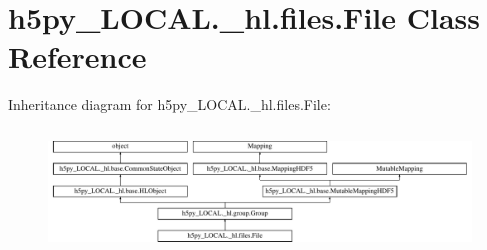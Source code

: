 \hypertarget{classh5py__LOCAL_1_1__hl_1_1files_1_1File}{}\section{h5py\+\_\+\+L\+O\+C\+A\+L.\+\_\+hl.\+files.\+File Class Reference}
\label{classh5py__LOCAL_1_1__hl_1_1files_1_1File}
Inheritance diagram for h5py\+\_\+\+L\+O\+C\+A\+L.\+\_\+hl.\+files.\+File\+:\begin{figure}[H]
\begin{center}
\leavevmode
\includegraphics[height=3.333333cm]{classh5py__LOCAL_1_1__hl_1_1files_1_1File}
\end{center}
\end{figure}
